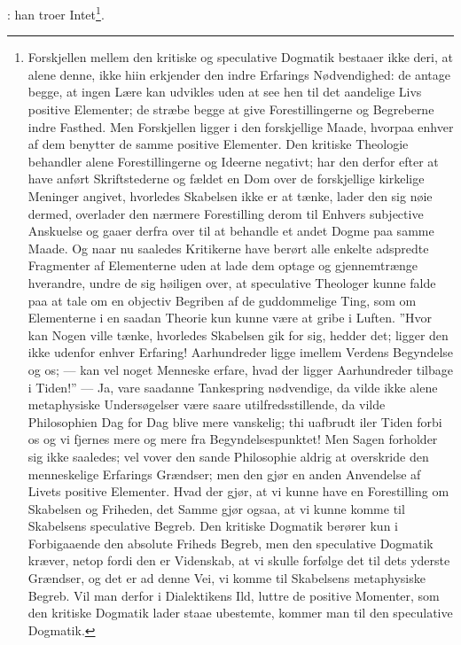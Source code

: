 \documentclass[12pt]{book}
\newcommand{\dsi}{\reflectbox{c}:}
\begin{document}
\dsi{} han troer Intet\footnote{Forskjellen mellem den kritiske og speculative
Dogmatik bestaaer ikke deri, at alene denne, ikke hiin erkjender den indre
Erfarings Nødvendighed: de antage begge, at ingen Lære kan udvikles uden at
see hen til det aandelige Livs positive Elementer; de stræbe begge at give
Forestillingerne og Begreberne indre Fasthed. Men Forskjellen ligger i den
forskjellige Maade, hvorpaa enhver af dem benytter de samme positive
Elementer. Den kritiske Theologie behandler alene Forestillingerne og Ideerne
negativt; har den derfor efter at have anført Skriftstederne og fældet en Dom
over de forskjellige kirkelige Meninger angivet, hvorledes Skabelsen ikke er
at tænke, lader den sig nøie dermed, overlader den nærmere Forestilling derom
til Enhvers subjective Anskuelse og gaaer derfra over til at behandle et andet
Dogme paa samme Maade. Og naar nu saaledes Kritikerne have berørt alle enkelte
adspredte Fragmenter af Elementerne uden at lade dem optage og gjennemtrænge
hverandre, undre de sig høiligen over, at speculative Theologer kunne falde
paa at tale om en objectiv Begriben af de guddommelige Ting, som om Elementerne
i en saadan Theorie kun kunne være at gribe i Luften. ”Hvor kan Nogen ville
tænke, hvorledes Skabelsen gik for sig, hedder det; ligger den ikke udenfor
enhver Erfaring! Aarhundreder ligge imellem Verdens Begyndelse og os; --- kan
vel noget Menneske erfare, hvad der ligger Aarhundreder tilbage i Tiden!” ---
Ja, vare saadanne Tankespring nødvendige, da vilde ikke alene metaphysiske
Undersøgelser være saare utilfredsstillende, da vilde Philosophien Dag for Dag
blive mere vanskelig; thi uafbrudt iler Tiden forbi os og vi fjernes mere og
mere fra Begyndelsespunktet! Men Sagen forholder sig ikke saaledes; vel vover
den sande Philosophie aldrig at overskride den menneskelige Erfarings
Grændser; men den gjør en anden Anvendelse af Livets positive Elementer. Hvad
der gjør, at vi kunne have en Forestilling om Skabelsen og Friheden, det Samme
gjør ogsaa, at vi kunne komme til Skabelsens speculative Begreb. Den kritiske
Dogmatik berører kun i Forbigaaende den absolute Friheds Begreb, men den
speculative Dogmatik kræver, netop fordi den er Videnskab, at vi skulle
forfølge det til dets yderste Grændser, og det er ad denne Vei, vi komme til
Skabelsens metaphysiske Begreb. Vil man derfor i Dialektikens Ild, luttre de
positive Momenter, som den kritiske Dogmatik lader staae ubestemte, kommer man
til den speculative Dogmatik.}.
\end{document}
